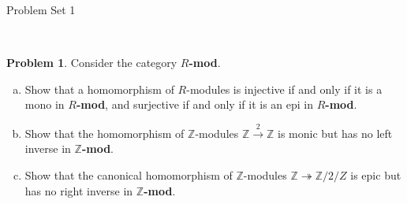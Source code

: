 \documentclass[11pt]{article}
\title{}
\date{\vspace{-0.5in}}
\newcommand{\Z}{\mathbb{Z}}
\theoremstyle{definition}
\newtheorem{problem}{Problem}
\begin{document}
\thispagestyle{fancy}
\pagestyle{fancy}

\vspace{3em}

\begin{center}
	{\LARGE Problem Set 1}
\end{center}

%
%
%


\


\begin{problem}
Consider the category {\bf $R$-mod}.

\begin{enumerate}[a)]
\item Show that a homomorphism of $R$-modules is injective if and only if it is a mono in {\bf $R$-mod}, and surjective if and only if it is an epi in {\bf $R$-mod}.

\item Show that the homomorphism of $\Z$-modules $\Z \xrightarrow{2} \Z$ is monic but has no left inverse in {\bf $\Z$-mod}.

\item Show that the canonical homomorphism of $\Z$-modules $\Z \twoheadrightarrow \Z/2/Z$ is epic but has no right inverse in {\bf $\Z$-mod}.
\end{enumerate}
\end{problem}
\end{document}
